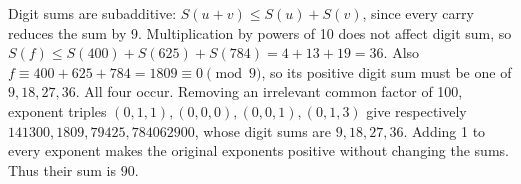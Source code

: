 Digit sums are subadditive: $S(u+v)\le S(u)+S(v)$, since every carry reduces the sum by 9. Multiplication by powers of 10 does not affect digit sum, so $S(f)\le S(400)+S(625)+S(784)=4+13+19=36$. Also $f\equiv400+625+784=1809\equiv0\pmod9$, so its positive digit sum must be one of $9,18,27,36$. All four occur. Removing an irrelevant common factor of 100, exponent triples $(0,1,1),(0,0,0),(0,0,1),(0,1,3)$ give respectively $141300,1809,79425,784062900$, whose digit sums are $9,18,27,36$. Adding 1 to every exponent makes the original exponents positive without changing the sums. Thus their sum is $\boxed{90}$.
